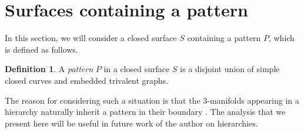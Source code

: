 \documentclass[oneside]{amsart}
\numberwithin{equation}{section}
\theoremstyle{plain}
\theoremstyle{definition}
\newtheorem{definition}[equation]{Definition}
\begin{document}
\section{Surfaces containing a pattern}
\label{Sec:Pattern}

In this section, we will consider a closed surface $S$ containing a pattern $P$, which is defined as follows.

\begin{definition}
A \emph{pattern} $P$ in a closed surface $S$ is a disjoint union of simple closed curves and embedded trivalent graphs. 
\end{definition}

The reason for considering such a situation is that the 3-manifolds appearing in a hierarchy naturally inherit a pattern in their boundary \cite{HakenHomeomorphism, Matveev}. The analysis that we present here will be useful in future work of the author on hierarchies.


\end{document}

